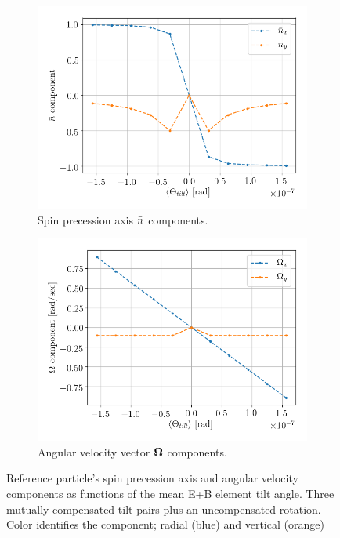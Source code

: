 \begin{figure}[!h]
	\centering
	\begin{subfigure}{\linewidth}
		\includegraphics[height=.35\paperheight]{images/fake_signal_sim/linearity_test_compensated+microrad_nbar}
		\caption{Spin precession axis $\bar n$ components.}
	\end{subfigure}
	\begin{subfigure}{\linewidth}
		\includegraphics[height=.35\paperheight]{images/fake_signal_sim/linearity_test_compensated+microrad_freq}
		\caption{Angular velocity vector $\boldsymbol{\Omega}$ components.}
	\end{subfigure}
	\caption{Reference particle's spin precession axis and angular velocity components as
		functions of the mean E+B element tilt angle. Three mutually-compensated tilt pairs plus an uncompensated
		rotation.
		Color identifies the component; radial (blue) and vertical (orange)\label{fig:Linearity_test_compensated}}
\end{figure}


